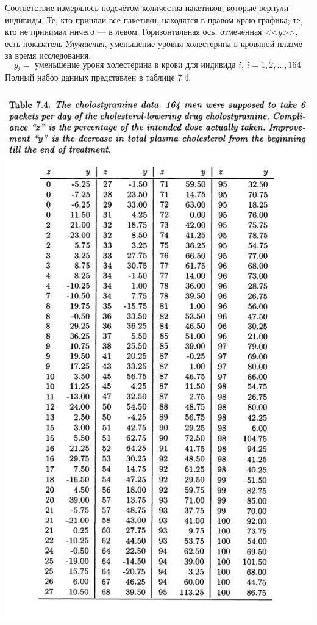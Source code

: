 Соответствие измерялось подсчётом количества пакетиков, которые вернули индивиды. Те, кто приняли все пакетики, находятся в правом краю графика; те, кто не принимал ничего --- в левом. Горизонтальная ось, отмеченная <<$y$>>, есть показатель \textit{Улучшения}, уменьшение уровня холестерина в кровяной плазме за время исследования,
$$
y_i = \text{ уменьшение уроня холестерина в крови для индивида } i,\, i = 1,2,\ldots, 164.
$$
Полный набор данных представлен в таблице 7.4.
\\~\\
\noindent
\includegraphics[width=0.95\linewidth]{6/t74.png}
\newline
\setcounter{table}{4}

